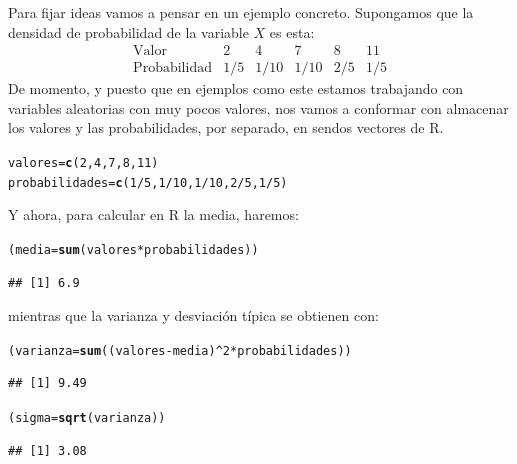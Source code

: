 \documentclass[10pt,a4paper]{article}\usepackage[]{graphicx}\usepackage[]{color}
\makeatletter
\newcommand{\hlnum}[1]{\textcolor[rgb]{0.686,0.059,0.569}{#1}}%
\newcommand{\hlopt}[1]{\textcolor[rgb]{0,0,0}{#1}}%
\newcommand{\hlstd}[1]{\textcolor[rgb]{0.345,0.345,0.345}{#1}}%
\newcommand{\hlkwb}[1]{\textcolor[rgb]{0.69,0.353,0.396}{#1}}%
\newcommand{\hlkwd}[1]{\textcolor[rgb]{0.737,0.353,0.396}{\textbf{#1}}}%
\newenvironment{kframe}{%
 \def\at@end@of@kframe{}%
 \ifinner\ifhmode%
  \def\at@end@of@kframe{\end{minipage}}%
  \begin{minipage}{\columnwidth}%
 \fi\fi%
 \def\FrameCommand##1{\hskip\@totalleftmargin \hskip-\fboxsep
 \colorbox{shadecolor}{##1}\hskip-\fboxsep
     \hskip-\linewidth \hskip-\@totalleftmargin \hskip\columnwidth}%
 \MakeFramed {\advance\hsize-\width
   \@totalleftmargin\z@ \linewidth\hsize
   \@setminipage}}%
 {\par\unskip\endMakeFramed%
 \at@end@of@kframe}
\newenvironment{knitrout}{}{} %
\makeatother
\begin{document}
Para fijar ideas vamos a pensar en un ejemplo concreto. Supongamos que la densidad de probabilidad de la variable $X$ es esta:
\[
\begin{array}{c|c|c|c|c|c|}
    \mbox{Valor}&2&4&7&8&11\\
    \hline
    \mbox{Probabilidad}&1/5&1/10&1/10&2/5&1/5
\end{array}
\]
De momento, y puesto que en ejemplos como este estamos trabajando con variables aleatorias con muy pocos valores, nos vamos a conformar con almacenar los valores y las probabilidades, por separado, en sendos vectores de R.
\begin{knitrout}
\color{fgcolor}\begin{kframe}
\begin{alltt}
\hlstd{valores} \hlkwb{=} \hlkwd{c}\hlstd{(}\hlnum{2}\hlstd{,}\hlnum{4}\hlstd{,}\hlnum{7}\hlstd{,}\hlnum{8}\hlstd{,}\hlnum{11}\hlstd{)}
\hlstd{probabilidades} \hlkwb{=} \hlkwd{c}\hlstd{(}\hlnum{1}\hlopt{/}\hlnum{5}\hlstd{,}\hlnum{1}\hlopt{/}\hlnum{10}\hlstd{,}\hlnum{1}\hlopt{/}\hlnum{10}\hlstd{,}\hlnum{2}\hlopt{/}\hlnum{5}\hlstd{,}\hlnum{1}\hlopt{/}\hlnum{5}\hlstd{)}
\end{alltt}
\end{kframe}
\end{knitrout}
Y ahora, para calcular en R la media, haremos:
\begin{knitrout}
\color{fgcolor}\begin{kframe}
\begin{alltt}
\hlstd{(media} \hlkwb{=} \hlkwd{sum}\hlstd{(valores} \hlopt{*} \hlstd{probabilidades) )}
\end{alltt}
\begin{verbatim}
## [1] 6.9
\end{verbatim}
\end{kframe}
\end{knitrout}
mientras que la varianza y desviación típica se obtienen con:
\begin{knitrout}
\color{fgcolor}\begin{kframe}
\begin{alltt}
\hlstd{(varianza} \hlkwb{=} \hlkwd{sum}\hlstd{((valores} \hlopt{-} \hlstd{media)}\hlopt{^}\hlnum{2} \hlopt{*} \hlstd{probabilidades) )}
\end{alltt}
\begin{verbatim}
## [1] 9.49
\end{verbatim}
\begin{alltt}
\hlstd{(sigma} \hlkwb{=} \hlkwd{sqrt}\hlstd{(varianza) )}
\end{alltt}
\begin{verbatim}
## [1] 3.08
\end{verbatim}
\end{kframe}
\end{knitrout}
\end{document}
